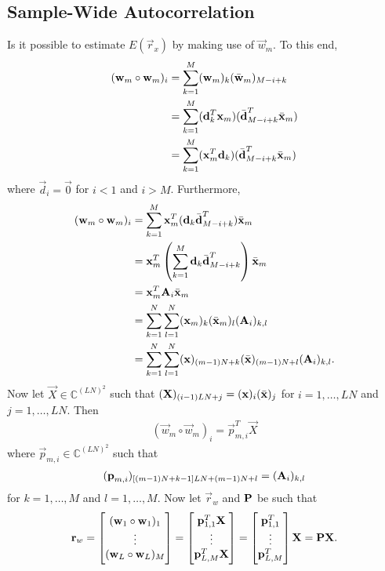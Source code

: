 \documentclass[a4paper, openany, oneside]{memoir}
\begin{document}
\subsection{Sample-Wide Autocorrelation}
Is it possible to estimate $E(\vec{r}_x)$ by making use of $\vec{w}_m$. To this end,
\begin{align*}
    (\boldsymbol{\mathbf{w}}_m \circ \boldsymbol{\mathbf{w}}_m)_i &= \sum_{k=1}^M (\boldsymbol{\mathbf{w}}_m)_k (\bar{\boldsymbol{\mathbf{w}}}_m)_{M-i+k} \\
    &= \sum_{k=1}^M (\boldsymbol{\mathbf{d}}_k^T \boldsymbol{\mathbf{x}}_m)(\bar{\boldsymbol{\mathbf{d}}}_{M-i+k}^T \bar{\boldsymbol{\mathbf{x}}}_m) \\
    &= \sum_{k=1}^M (\boldsymbol{\mathbf{x}}_m^T \boldsymbol{\mathbf{d}}_k)(\bar{\boldsymbol{\mathbf{d}}}_{M-i+k}^T \bar{\boldsymbol{\mathbf{x}}}_m)
\end{align*}
where $\vec{d}_i = \vec{0}$ for $i < 1$ and $i > M$. Furthermore,
\begin{align*}
    (\boldsymbol{\mathbf{w}}_m \circ \boldsymbol{\mathbf{w}}_m)_i &= \sum_{k=1}^M \boldsymbol{\mathbf{x}}_m^T (\boldsymbol{\mathbf{d}}_k \bar{\boldsymbol{\mathbf{d}}}_{M-i+k}^T) \bar{\boldsymbol{\mathbf{x}}}_m \\
    &= \boldsymbol{\mathbf{x}}_m^T\left(\sum_{k=1}^M  \boldsymbol{\mathbf{d}}_k \bar{\boldsymbol{\mathbf{d}}}_{M-i+k}^T\right) \bar{\boldsymbol{\mathbf{x}}}_m \\
    &= \boldsymbol{\mathbf{x}}_m^T \boldsymbol{\mathbf{A}}_i \bar{\boldsymbol{\mathbf{x}}}_m \\
    &= \sum_{k = 1}^N \sum_{l=1}^N (\boldsymbol{\mathbf{x}}_m)_k (\bar{\boldsymbol{\mathbf{x}}}_m)_l (\boldsymbol{\mathbf{A}}_i)_{k,l} \\
    &= \sum_{k = 1}^N \sum_{l=1}^N (\boldsymbol{\mathbf{x}})_{(m-1)N+k} (\bar{\boldsymbol{\mathbf{x}}})_{(m-1)N+l} (\boldsymbol{\mathbf{A}}_i)_{k,l}.
\end{align*}
Now let $\vec{X} \in \mathbb{C}^{(LN)^2}$ such that $(\boldsymbol{\mathbf{X}})_{(i-1)LN+j} = (\boldsymbol{\mathbf{x}})_i (\bar{\boldsymbol{\mathbf{x}}})_j$ for $i = 1,\ldots,LN$ and $j = 1,\ldots,LN$. Then
\begin{align*}
    (\vec{w}_m \circ \vec{w}_m)_i = \vec{p}_{m,i}^T \vec{X}
\end{align*}
where $\vec{p}_{m,i} \in \mathbb{C}^{(LN)^2}$ such that
\begin{align*}
    (\boldsymbol{\mathbf{p}}_{m,i})_{[(m-1)N+k-1]LN+(m-1)N+l} = (\boldsymbol{\mathbf{A}}_i)_{k,l}
\end{align*}
for $k = 1,\ldots,M$ and $l = 1,\ldots,M$. Now let $\vec{r}_w$ and $\boldsymbol{\mathbf{P}}$ be such that
\begin{align*}
    \boldsymbol{\mathbf{r}}_w = \begin{bmatrix}
        (\boldsymbol{\mathbf{w}}_1 \circ \boldsymbol{\mathbf{w}}_1)_1 \\
        \vdots \\
        (\boldsymbol{\mathbf{w}}_L \circ \boldsymbol{\mathbf{w}}_L)_M
    \end{bmatrix} = \begin{bmatrix}
        \boldsymbol{\mathbf{p}}_{1,1}^T \boldsymbol{\mathbf{X}} \\
        \vdots \\
        \boldsymbol{\mathbf{p}}_{L,M}^T \boldsymbol{\mathbf{X}}
    \end{bmatrix} = \begin{bmatrix}
        \boldsymbol{\mathbf{p}}_{1,1}^T \\
        \vdots \\
        \boldsymbol{\mathbf{p}}_{L,M}^T
    \end{bmatrix} \boldsymbol{\mathbf{X}} = \boldsymbol{\mathbf{P}} \boldsymbol{\mathbf{X}}.
\end{align*}
\end{document}
